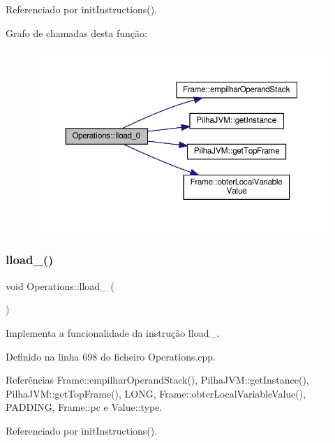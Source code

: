 Referenciado por init\+Instructions().

Grafo de chamadas desta função\+:
\nopagebreak
\begin{figure}[H]
\begin{center}
\leavevmode
\includegraphics[width=350pt]{classOperations_a556b64c0764f7a654a30540eb355aab3_cgraph}
\end{center}
\end{figure}
\mbox{\label{classOperations_a34e91f6520ca574abce6b2b30ce91948}} 
\subsubsection{\texorpdfstring{lload\+\_()}{lload\_1()}}
{\footnotesize\ttfamily void Operations\+::lload\+\_ (\begin{DoxyParamCaption}{ }\end{DoxyParamCaption})\hspace{0.3cm}{\ttfamily [private]}}



Implementa a funcionalidade da instrução lload\+\_. 



Definido na linha 698 do ficheiro Operations.\+cpp.



Referências Frame\+::empilhar\+Operand\+Stack(), Pilha\+J\+V\+M\+::get\+Instance(), Pilha\+J\+V\+M\+::get\+Top\+Frame(), L\+O\+NG, Frame\+::obter\+Local\+Variable\+Value(), P\+A\+D\+D\+I\+NG, Frame\+::pc e Value\+::type.



Referenciado por init\+Instructions().


